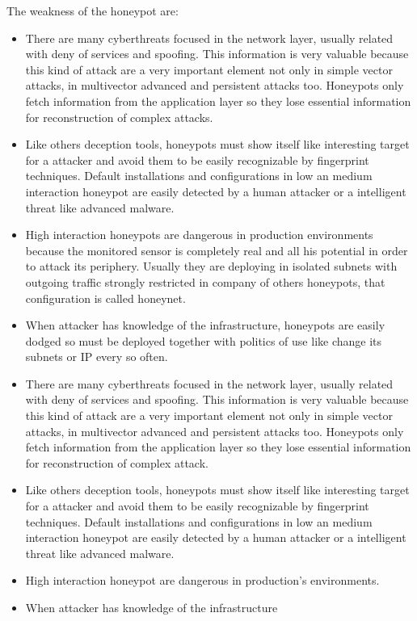 \documentclass[a4paper]{llncs}
\begin{document}
The weakness of the honeypot are:
\begin{itemize}
\item There are many cyberthreats focused in the network layer, usually related with deny of services and spoofing. This information is very valuable because this kind of attack are a very important element not only in simple vector attacks, in multivector advanced and persistent attacks too. Honeypots only fetch information from the application layer so they lose essential information for reconstruction of complex attacks.
\item Like others deception tools, honeypots must show itself like interesting target for a attacker and avoid them to be easily recognizable by fingerprint techniques. Default installations and configurations in low an medium interaction honeypot are easily detected by a human attacker or a intelligent threat like advanced malware.
\item High interaction honeypots are dangerous in production environments because the monitored sensor is completely real and all his potential in order to attack its periphery. Usually they are deploying in isolated subnets with outgoing traffic strongly restricted in company of others honeypots, that configuration is called honeynet.
\item When attacker has knowledge of the infrastructure, honeypots are easily dodged so must be deployed together with politics of use like change its subnets or IP every so often.
\item There are many cyberthreats focused in the network layer, usually related with deny of services and spoofing. This information is very valuable because this kind of attack are a very important element not only in simple vector attacks, in multivector advanced and persistent attacks too. Honeypots only fetch information from the application layer so they lose essential information for reconstruction of complex attack.
\item Like others deception tools, honeypots must show itself like interesting target for a attacker and avoid them to be easily recognizable by fingerprint techniques. Default installations and configurations in low an medium interaction honeypot are easily detected by a human attacker or a intelligent threat like advanced malware. %
\item High interaction honeypot are dangerous in production's environments.
\item When attacker has knowledge of the infrastructure 
\end{itemize}
\end{document}
